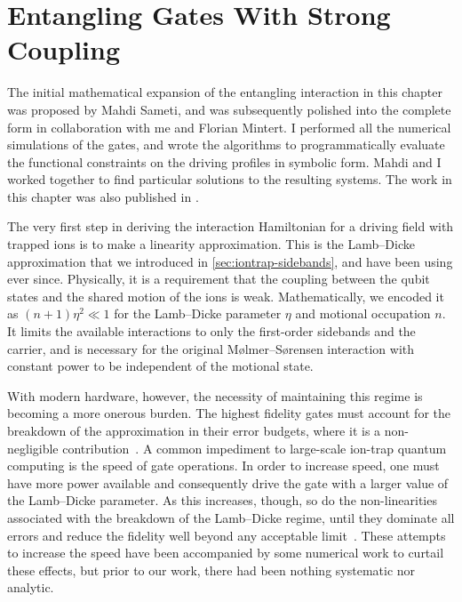 \chapter{Entangling Gates With Strong Coupling}
\label{sec:beyondld}

\begin{coauthorship}
The initial mathematical expansion of the entangling interaction in this chapter was proposed by Mahdi Sameti, and was subsequently polished into the complete form in collaboration with me and Florian Mintert.
I performed all the numerical simulations of the gates, and wrote the algorithms to programmatically evaluate the functional constraints on the driving profiles in symbolic form.
Mahdi and I worked together to find particular solutions to the resulting systems.
The work in this chapter was also published in .
\end{coauthorship}

The very first step in deriving the interaction Hamiltonian for a driving field with trapped ions is to make a linearity approximation.
This is the Lamb--Dicke approximation that we introduced in \cref{sec:iontrap-sidebands}, and have been using ever since.
Physically, it is a requirement that the coupling between the qubit states and the shared motion of the ions is weak.
Mathematically, we encoded it as $(n+1)\eta^2\ll1$ for the Lamb--Dicke parameter $\eta$ and motional occupation $n$.
It limits the available interactions to only the first-order sidebands and the carrier, and is necessary for the original M\o lmer--S\o rensen interaction with constant power to be independent of the motional state.

With modern hardware, however, the necessity of maintaining this regime is becoming a more onerous burden.
The highest fidelity gates must account for the breakdown of the approximation in their error budgets, where it is a non-negligible contribution~\cite{Ballance2016,Gaebler2016}.
A common impediment to large-scale ion-trap quantum computing is the speed of gate operations.
In order to increase speed, one must have more power available and consequently drive the gate with a larger value of the Lamb--Dicke parameter.
As this increases, though, so do the non-linearities associated with the breakdown of the Lamb--Dicke regime, until they dominate all errors and reduce the fidelity well beyond any acceptable limit~\cite{Schaefer2018}.
These attempts to increase the speed have been accompanied by some numerical work to curtail these effects, but prior to our work, there had been nothing systematic nor analytic.

